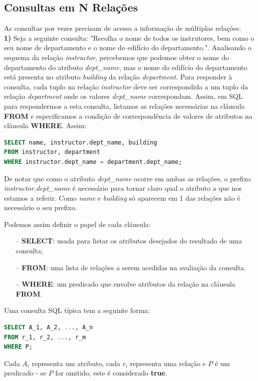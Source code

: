 \documentclass[oneside]{book}
\theoremstyle{definition}
\begin{document}
\subsection{Consultas em N Relações}
As consultas por vezes precisam de acesso a informação de múltiplas relações. \\
\textbf{1)} Seja a seguinte consulta: "Recolha o nome de todos os instrutores, bem como o seu nome de departamento e o nome do edifício do departamento.". Analisando o esquema da relação \textit{instructor}, percebemos que podemos obter o nome do departamento do atributo \textit{dept\_name}, mas o nome do edifício do departamento está presenta no atributo \textit{building} da relação \textit{department}. Para responder à consulta, cada tuplo na relação \textit{instructor} deve ser correspondida a um tuplo da relação \textit{department} onde os valores \textit{dept\_name} correspondam. Assim, em SQL para respondermos a esta consulta, listamos as relações necessárias na cláusula \textbf{FROM} e especificamos a condição de correspondência de valores de atributos na cláusula \textbf{WHERE}. Assim:

\begin{lstlisting}[language=SQL, morekeywords={REFERENCES, REFRESH, MATERIALIZED, CONCURRENTLY}, framesep=8pt, xleftmargin=40pt, framexleftmargin=40pt, frame=tb, framerule=0pt]
SELECT name, instructor.dept_name, building
FROM instructor, department
WHERE instructor.dept_name = department.dept_name;
\end{lstlisting} 
De notar que como o atributo \textit{dept\_name} ocorre em ambas as relações, o prefixo \textit{instructor.dept\_name} é necessário para tornar claro qual o atributo a que nos estamos a referir. Como \textit{name} e \textit{building} só aparecem em 1 das relações não é necessário o seu prefixo.

Podemos assim definir o papel de cada cláusula:
\begin{itemize}
    \itemsep0cm
    \item[--]\textbf{SELECT}: usada para listar os atributos desejados do resultado de uma consulta;
    \item[--]\textbf{FROM}: uma lista de relações a serem acedidas na avaliação da consulta.
    \item[--]\textbf{WHERE}: um predicado que envolve atributos da relação na cláusula \textbf{FROM}.
\end{itemize}

Uma consulta SQL típica tem a seguinte forma:
\begin{lstlisting}[language=SQL, morekeywords={REFERENCES, REFRESH, MATERIALIZED, CONCURRENTLY}, framesep=8pt, xleftmargin=40pt, framexleftmargin=40pt, frame=tb, framerule=0pt]
SELECT A_1, A_2, ..., A_n
FROM r_1, r_2, ..., r_m
WHERE P;
\end{lstlisting}
Cada $A_i$ representa um atributo, cada $r_i$ representa uma relação e $P$ é um predicado - se $P$ for omitido, este é considerado \textbf{true}.
\end{document}
